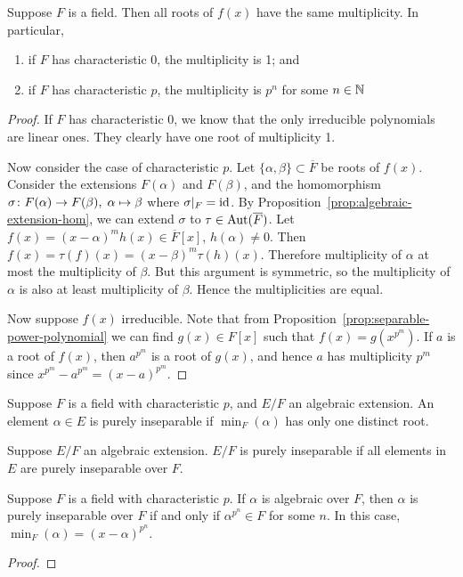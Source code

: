\begin{proposition}
    Suppose \(F\) is a field.
    Then all roots of \(f(x)\) have the same multiplicity.
    In particular,
    \begin{enumerate}[label={(\alph*)}, itemsep=0mm]
        \item if \(F\) has characteristic 0, the multiplicity is 1; and
        \item if \(F\) has characteristic \(p\),
            the multiplicity is \(p^n\) for some \(n \in \mathbb{N}\)
    \end{enumerate}
\end{proposition}
\begin{proof}
    If \(F\) has characteristic 0,
    we know that the only irreducible polynomials are linear ones.
    They clearly have one root of multiplicity 1.

    Now consider the case of characteristic \(p\).
    Let \(\{\alpha,\beta\}\subset\overline{F}\) be roots of \(f(x)\).
    Consider the extensions \(F(\alpha)\) and \(F(\beta)\),
    and the homomorphism \(\sigma\colon F(\alpha)\to F(\beta),\;\alpha\mapsto\beta\)
    where \(\sigma\vert_F = \operatorname{id}\).
    By Proposition~\ref{prop:algebraic-extension-hom},
    we can extend \(\sigma\) to \(\tau\in\operatorname{Aut}(\overline{F})\).
    Let \(f(x) = {(x-\alpha)}^m h(x) \in \overline{F}[x]\), \(h(\alpha) \neq 0\).
    Then \(f(x) = \tau(f)(x) = {(x-\beta)}^m \tau(h)(x)\).
    Therefore multiplicity of \(\alpha\) at most the multiplicity of \(\beta\).
    But this argument is symmetric,
    so the multiplicity of \(\alpha\) is also at least multiplicity of \(\beta\).
    Hence the multiplicities are equal.

    Now suppose \(f(x)\) irreducible.
    Note that from Proposition~\ref{prop:separable-power-polynomial}
    we can find \(g(x) \in F[x]\) such that \(f(x) = g(x^{p^m})\).
    If \(a\) is a root of \(f(x)\), then \(a^{p^m}\) is a root of \(g(x)\),
    and hence \(a\) has multiplicity \(p^m\)
    since \(x^{p^m} - a^{p^m} = {(x-a)}^{p^m}\).
\end{proof}

\begin{definition}
    Suppose \(F\) is a field with characteristic \(p\),
    and \(E/F\) an algebraic extension.
    An element \(\alpha \in E\) is purely inseparable
    if \(\min_F(\alpha)\) has only one distinct root.
\end{definition}
\begin{definition}
    Suppose \(E/F\) an algebraic extension.
    \(E/F\) is purely inseparable
    if all elements in \(E\) are purely inseparable over \(F\).
\end{definition}
\begin{lemma}\label{lem:purely-inseparable-power}
    Suppose \(F\) is a field with characteristic \(p\).
    If \(\alpha\) is algebraic over \(F\),
    then \(\alpha\) is purely inseparable over \(F\)
    if and only if \(\alpha^{p^n} \in F\) for some \(n\).
    In this case, \(\min_F(\alpha) = {(x-\alpha)}^{p^n}\).
\end{lemma}
\begin{proof}
\end{proof}

